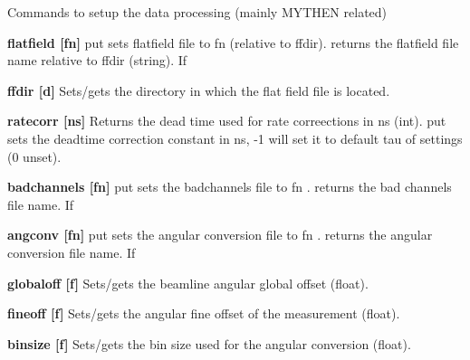 Commands to setup the data processing (mainly MYTHEN related)


\begin{DoxyItemize}
\item {\bfseries flatfield \mbox{[}fn\mbox{]}} {\ttfamily put} sets flatfield file to {\ttfamily fn} (relative to {\ttfamily ffdir}).  returns the flatfield file name relative to {\ttfamily ffdir} (string). If
\end{DoxyItemize}


\begin{DoxyItemize}
\item {\bfseries ffdir \mbox{[}d\mbox{]}} Sets/gets the directory in which the flat field file is located.
\end{DoxyItemize}


\begin{DoxyItemize}
\item {\bfseries ratecorr \mbox{[}ns\mbox{]}} Returns the dead time used for rate correections in ns (int). {\ttfamily put} sets the deadtime correction constant in ns, -\/1 will set it to default tau of settings (0 unset).
\end{DoxyItemize}


\begin{DoxyItemize}
\item {\bfseries badchannels \mbox{[}fn\mbox{]}} {\ttfamily put} sets the badchannels file to {\ttfamily fn} .  returns the bad channels file name. If
\end{DoxyItemize}


\begin{DoxyItemize}
\item {\bfseries angconv \mbox{[}fn\mbox{]}} {\ttfamily put} sets the angular conversion file to {\ttfamily fn} .  returns the angular conversion file name. If
\end{DoxyItemize}


\begin{DoxyItemize}
\item {\bfseries globaloff \mbox{[}f\mbox{]}} Sets/gets the beamline angular global offset (float).
\end{DoxyItemize}


\begin{DoxyItemize}
\item {\bfseries fineoff \mbox{[}f\mbox{]}} Sets/gets the angular fine offset of the measurement (float).
\end{DoxyItemize}


\begin{DoxyItemize}
\item {\bfseries binsize \mbox{[}f\mbox{]}} Sets/gets the bin size used for the angular conversion (float).
\end{DoxyItemize}


